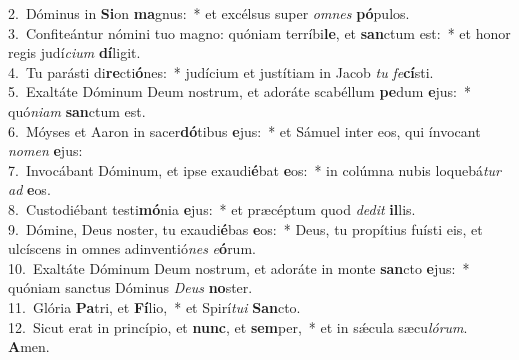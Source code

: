 {2.~}Dóminus in \textbf{Si}on \textbf{ma}gnus:~* et excélsus super \textit{om}\textit{nes} \textbf{pó}pulos.\\
{3.~}Confiteántur nómini tuo magno: quóniam terríbi\textbf{le}, et \textbf{san}ctum est:~* et honor regis judí\textit{ci}\textit{um} \textbf{dí}ligit.\\
{4.~}Tu parásti di\textbf{re}cti\textbf{ó}nes:~* judícium et justítiam in Jacob \textit{tu} \textit{fe}\textbf{cí}sti.\\
{5.~}Exaltáte Dóminum Deum nostrum, et adoráte scabéllum \textbf{pe}dum \textbf{e}jus:~* quó\textit{ni}\textit{am} \textbf{san}ctum est.\\
{6.~}Móyses et Aaron in sacer\textbf{dó}tibus \textbf{e}jus:~* et Sámuel inter eos, qui ínvocant \textit{no}\textit{men} \textbf{e}jus:\\
{7.~}Invocábant Dóminum, et ipse exaudi\textbf{é}bat \textbf{e}os:~* in colúmna nubis loquebá\textit{tur} \textit{ad} \textbf{e}os.\\
{8.~}Custodiébant testi\textbf{mó}nia \textbf{e}jus:~* et præcéptum quod \textit{de}\textit{dit} \textbf{il}lis.\\
{9.~}Dómine, Deus noster, tu exaudi\textbf{é}bas \textbf{e}os:~* Deus, tu propítius fuísti eis, et ulcíscens in omnes adinventió\textit{nes} \textit{e}\textbf{ó}rum.\\
{10.~}Exaltáte Dóminum Deum nostrum, et adoráte in monte \textbf{san}cto \textbf{e}jus:~* quóniam sanctus Dóminus \textit{De}\textit{us} \textbf{no}ster.\\
{11.~}Glória \textbf{Pa}tri, et \textbf{Fí}lio,~* et Spirí\textit{tu}\textit{i} \textbf{San}cto.\\
{12.~}Sicut erat in princípio, et \textbf{nunc}, et \textbf{sem}per,~* et in sǽcula sæcu\textit{ló}\textit{rum}. \textbf{A}men.\\
